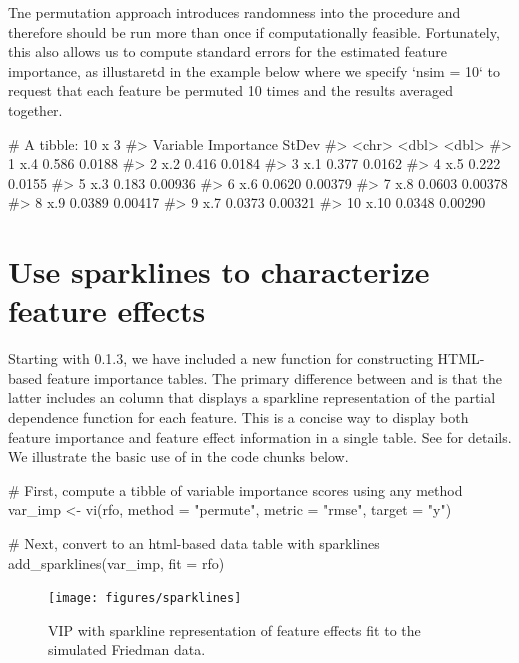 Tne permutation approach introduces randomness into the procedure and therefore should be run more than once if computationally feasible. Fortunately, this also allows us to compute standard errors for the estimated feature importance, as illustaretd in the example below where we specify `nsim = 10` to request that each feature be permuted 10 times and the results averaged together.

\begin{example}
# A tibble: 10 x 3
#>    Variable Importance   StDev
#>    <chr>         <dbl>   <dbl>
#>  1 x.4          0.586  0.0188 
#>  2 x.2          0.416  0.0184 
#>  3 x.1          0.377  0.0162 
#>  4 x.5          0.222  0.0155 
#>  5 x.3          0.183  0.00936
#>  6 x.6          0.0620 0.00379
#>  7 x.8          0.0603 0.00378
#>  8 x.9          0.0389 0.00417
#>  9 x.7          0.0373 0.00321
#> 10 x.10         0.0348 0.00290
\end{example}


\section{Use sparklines to characterize feature effects}

Starting with  0.1.3, we have included a new function  for constructing HTML-based feature importance tables. The primary difference between  and  is that the latter includes an  column that displays a sparkline representation of the partial dependence function for each feature. This is a concise way to display both feature importance and feature effect information in a single table. See  for details. We illustrate the basic use of  in the code chunks below.

\begin{example}
# First, compute a tibble of variable importance scores using any method
var_imp <- vi(rfo, method = "permute", metric = "rmse", target = "y")

# Next, convert to an html-based data table with sparklines
add_sparklines(var_imp, fit = rfo)
\end{example}

\begin{figure}[!htb]
  \centering 
  \texttt{[image: figures/sparklines]} 
  \caption{VIP with sparkline representation of feature effects fit to the simulated Friedman data.}
  \label{fig:sparklines}
\end{figure}


